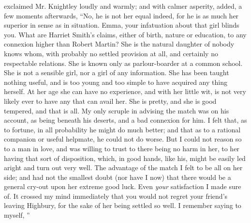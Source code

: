  exclaimed Mr. Knightley loudly and warmly; and with calmer asperity, added, a few moments afterwards, “No, he is not her equal indeed, for he is as much her superior in sense as in situation. Emma, your infatuation about that girl blinds you. What are Harriet Smith's claims, either of birth, nature or education, to any connexion higher than Robert Martin? She is the natural daughter of nobody knows whom, with probably no settled provision at all, and certainly no respectable relations. She is known only as parlour-boarder at a common school. She is not a sensible girl, nor a girl of any information. She has been taught nothing useful, and is too young and too simple to have acquired any thing herself. At her age she can have no experience, and with her little wit, is not very likely ever to have any that can avail her. She is pretty, and she is good tempered, and that is all. My only scruple in advising the match was on his account, as being beneath his deserts, and a bad connexion for him. I felt that, as to fortune, in all probability he might do much better; and that as to a rational companion or useful helpmate, he could not do worse. But I could not reason so to a man in love, and was willing to trust to there being no harm in her, to her having that sort of disposition, which, in good hands, like his, might be easily led aright and turn out very well. The advantage of the match I felt to be all on her side; and had not the smallest doubt (nor have I now) that there would be a general cry-out upon her extreme good luck. Even {\em your} satisfaction I made sure of. It crossed my mind immediately that you would not regret your friend's leaving Highbury, for the sake of her being settled so well. I remember saying to myself, ”


